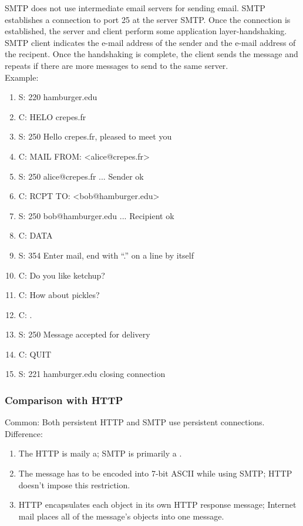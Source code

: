 \hf
SMTP does not use intermediate email servers for sending email. SMTP establishes a connection
to port 25 at the server SMTP. Once the connection is established, the server and
client perform some application layer-handshaking. SMTP client indicates the e-mail
address of the sender and the e-mail address of the recipent. Once the handshaking is
complete, the client sends the message and repeats if there are more messages to send
to the same server.\\

Example:
\begin{enumerate}
    \item S: 220 hamburger.edu
    \item C: HELO crepes.fr
    \item S: 250 Hello crepes.fr, pleased to meet you
    \item C: MAIL FROM: <alice@crepes.fr>
    \item S: 250 alice@crepes.fr ... Sender ok
    \item C: RCPT TO: <bob@hamburger.edu>
    \item S: 250 bob@hamburger.edu ... Recipient ok
    \item C: DATA
    \item S: 354 Enter mail, end with “.” on a line by itself
    \item C: Do you like ketchup?
    \item C: How about pickles?
    \item C: .
    \item S: 250 Message accepted for delivery
    \item C: QUIT
    \item S: 221 hamburger.edu closing connection
\end{enumerate}

\subsubsection{Comparison with HTTP}

\hf Common: Both persistent HTTP and SMTP use persistent connections. \\

Difference:
\begin{enumerate}
    \item The HTTP is maily a; SMTP is primarily a .
    \item The message has to be encoded into 7-bit ASCII while using SMTP; HTTP doesn't impose this restriction.
    \item HTTP encapsulates each object in its own HTTP response message; Internet mail places all of the message's objects into one message.
\end{enumerate}


